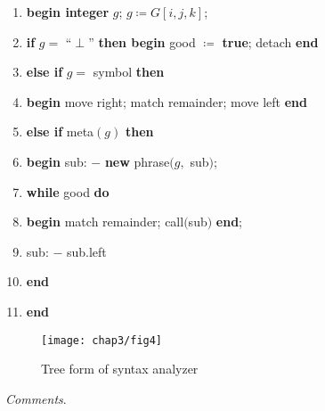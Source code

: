 \begin{enumerate}[nosep, label=\arabic*.]
	\item \textbf{begin integer} $g$; $g\coloneq G[i, j, k]$;
	\item \label{en:comment-label-2}
	\quad \textbf{if} $g =$ ``$\perp$'' \textbf{then begin} good $\coloneq$ \textbf{true}; detach \textbf{end}
	
	\item \quad \textbf{else if} $g =$ symbol \textbf{then}
	
	\item \label{en:comment-label-4}
	\quad \textbf{begin} move right; match remainder; move left \textbf{end}
	
	\item \quad \textbf{else if} meta$(g)$ \textbf{then}
	
	\item \label{en:comment-label-6}
	\quad \textbf{begin} sub: $-$ \textbf{new} phrase$(g,$ sub$)$;
	\item \quad \quad \textbf{while} good \textbf{do}
	
	\item \label{en:comment-label-8}
	\quad \quad \textbf{begin} match remainder; call$($sub$)$ \textbf{end};
	
	\item \label{en:comment-label-9}
	\quad \quad sub: $-$ sub.left
	
	\item \quad \quad \textbf{end}
	\item \quad \textbf{end}
\end{enumerate}

\begin{figure}[h]
	\centering
	\texttt{[image: chap3/fig4]}
	\caption{Tree form of syntax analyzer}
	\label{fig:syntax-analyzer-1}
\end{figure}

\noindent
\textit{Comments}.

